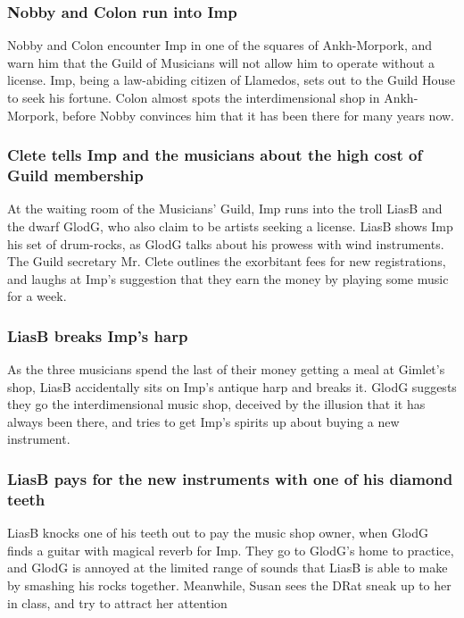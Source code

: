 \subsubsection{\Gls{Nobby} and \Gls{Colon} run into \Gls{Imp}}
\Gls{Nobby} and \Gls{Colon} encounter \Gls{Imp} in one of the squares of Ankh-Morpork, and warn
him that the Guild of Musicians will not allow him to operate without a license. \Gls{Imp}, being
a law-abiding citizen of Llamedos, sets out to the Guild House to seek his fortune. \Gls{Colon}
almost spots the interdimensional shop in Ankh-Morpork, before \Gls{Nobby} convinces him that it
has been there for many years now.

\subsubsection{\Gls{Clete} tells \Gls{Imp} and the musicians about the high cost of Guild
    membership}
At the waiting room of the Musicians' Guild, \Gls{Imp} runs into the troll \Gls{LiasB} and the
dwarf \Gls{GlodG}, who also claim to be artists seeking a license. \Gls{LiasB} shows \Gls{Imp} his
set of drum-rocks, as \Gls{GlodG} talks about his prowess with wind instruments. The Guild secretary
Mr. \Gls{Clete} outlines the exorbitant fees for new registrations, and laughs at \Gls{Imp}'s
suggestion that they earn the money by playing some music for a week.

\subsubsection{\Gls{LiasB} breaks \Gls{Imp}'s harp}
As the three musicians spend the last of their money getting a meal at \Gls{Gimlet}'s shop,
\Gls{LiasB} accidentally sits on \Gls{Imp}'s antique harp and breaks it. \Gls{GlodG} suggests they
go the interdimensional music shop, deceived by the illusion that it has always been there, and
tries to get \Gls{Imp}'s spirits up about buying a new instrument.

\subsubsection{\Gls{LiasB} pays for the new instruments with one of his diamond teeth}
\Gls{LiasB} knocks one of his teeth out to pay the music shop owner, when \Gls{GlodG} finds a
guitar with magical reverb for \Gls{Imp}. They go to \Gls{GlodG}'s home to practice, and \Gls{GlodG}
is annoyed at the limited range of sounds that \Gls{LiasB} is able to make by smashing his rocks
together. Meanwhile, \Gls{Susan} sees the \Gls{DRat} sneak up to her in class, and try to attract
her attention

